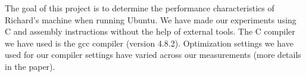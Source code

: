 The goal of this project is to determine the performance characteristics of Richard's machine when running Ubuntu. We have made our experiments using C and assembly instructions without the help of external tools. The C compiler we have used is the gcc compiler (version 4.8.2). Optimization settings we have used for our compiler settings have varied across our measurements (more details in the paper).